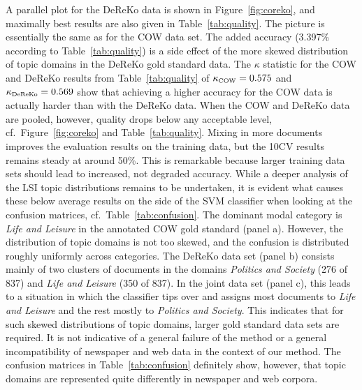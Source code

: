 \documentclass[11pt]{article}
\begin{document}
A parallel plot for the DeReKo data is shown in Figure~\ref{fig:coreko}, and maximally best results are also given in Table~\ref{tab:quality}.
The picture is essentially the same as for the COW data set.
The added accuracy (3.397\% according to Table~\ref{tab:quality}) is a side effect of the more skewed distribution of topic domains in the DeReKo gold standard data.
The $\kappa$ statistic for the COW and DeReKo results from Table~\ref{tab:quality} of $\kappa_{\textrm{\tiny COW}}=0.575$ and $\kappa_{\textrm{\tiny DeReKo}}=0.569$ show that achieving a higher accuracy for the COW data is actually harder than with the DeReKo data.
When the COW and DeReKo data are pooled, however, quality drops below any acceptable level, cf.\ Figure~\ref{fig:coreko} and Table~\ref{tab:quality}.
Mixing in more documents improves the evaluation results on the training data, but the 10CV results remains steady at around 50\%.
This is remarkable because larger training data sets should lead to increased, not degraded accuracy.
While a deeper analysis of the LSI topic distributions remains to be undertaken, it is evident what causes these below average results on the side of the SVM classifier when looking at the confusion matrices, cf.\ Table~\ref{tab:confusion}.
The dominant modal category is \textit{Life and Leisure} in the annotated COW gold standard (panel a).
However, the distribution of topic domains is not too skewed, and the confusion is distributed roughly uniformly across categories.
The DeReKo data set (panel b) consists mainly of two clusters of documents in the domains \textit{Politics and Society} (276 of 837) and \textit{Life and Leisure} (350 of 837).
In the joint data set (panel c), this leads to a situation in which the classifier tips over and assigns most documents to \textit{Life and Leisure} and the rest mostly to \textit{Politics and Society}.
This indicates that for such skewed distributions of topic domains, larger gold standard data sets are required.
It is not indicative of a general failure of the method or a general incompatibility of newspaper and web data in the context of our method.
The confusion matrices in Table~\ref{tab:confusion} definitely show, however, that topic domains are represented quite differently in newspaper and web corpora.
\end{document}
